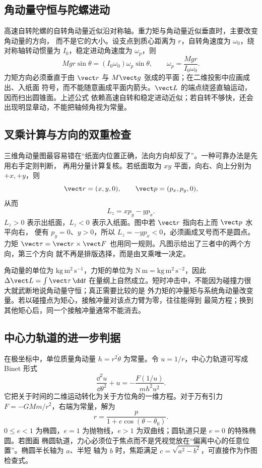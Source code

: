 \subsection*{角动量守恒与陀螺进动}

高速自转陀螺的自转角动量近似沿对称轴。重力矩与角动量近似垂直时，主要改变角动量的方向，
而不是它的大小。设支点到质心距离为 $r$，自转角速度为 $\omega_0$，绕对称轴转动惯量为
$I_0$，稳定进动角速度为 $\omega_p$，则
\[
  Mgr\sin\theta=(I_0\omega_0)\omega_p\sin\theta,
  \qquad
  \omega_p=\frac{Mgr}{I_0\omega_0}.
\]
力矩方向必须垂直于由 $\vect r$ 与 $M\vect g$ 张成的平面；在二维投影中应画成出、入纸面
符号，而不能随意画成平面内箭头。$\vect L$ 的端点绕竖直轴运动，因而扫出圆锥面。上述公式
依赖高速自转和稳定进动近似；若自转不够快，还会出现明显章动，不能把轴倾角视为常量。

\subsection*{叉乘计算与方向的双重检查}

三维角动量图最容易错在“纸面内位置正确，法向方向却反了”。一种可靠办法是先用右手定则判断，
再用分量计算复核。若纸面取为 $xy$ 平面，向右、向上分别为 $+x,+y$，则
\[
 \vect r=(x,y,0),\qquad \vect p=(p_x,p_y,0),
\]
从而
\[
 L_z=xp_y-yp_x.
\]
$L_z>0$ 表示出纸面，$L_z<0$ 表示入纸面。图中若 $\vect r$ 指向右上而 $\vect p$ 水平向右，
便有 $p_y=0$、$y>0$，所以 $L_z=-yp_x<0$，必须画成叉号而不是圆点。力矩
$\vect\tau=\vect r\times\vect F$ 也用同一规则。凡图示给出了三者中的两个方向，第三个方向
就不再是排版选择，而是由叉乘唯一决定。

角动量的单位为 $\mathrm{kg\,m^2\,s^{-1}}$，力矩的单位为
$\mathrm{N\,m}=\mathrm{kg\,m^2\,s^{-2}}$，因此 $\Delta\vect L=\int\vect\tau\,\dd t$
在量纲上自然成立。短时冲击中，不能因为碰撞力很大就武断地说角动量守恒；真正需要比较的是
外力矩的冲量矩与系统角动量改变量。若以碰撞点为矩心，接触冲量对该点力臂为零，往往能得到
最简方程；换到其他矩心后，同一个接触冲量通常不能消去。

\subsection*{中心力轨道的进一步判据}

在极坐标中，单位质量角动量 $h=r^2\dot\theta$ 为常量。令 $u=1/r$，中心力轨道可写成 Binet
形式
\[
 \frac{\dd^2u}{\dd\theta^2}+u=-\frac{F(1/u)}{mh^2u^2}.
\]
它把关于时间的二维运动转化为关于方位角的一维方程。对于万有引力
$F=-GMm/r^2$，右端为常量，解为
\[
 r=\frac{p}{1+e\cos(\theta-\theta_0)}.
\]
$0\le e<1$ 为椭圆，$e=1$ 为抛物线，$e>1$ 为双曲线；圆轨道只是 $e=0$ 的特殊椭圆。若图画
椭圆轨道，力心必须位于焦点而不是凭视觉放在“偏离中心的任意位置”。椭圆半长轴为 $a$、半短
轴为 $b$ 时，焦距满足 $c=\sqrt{a^2-b^2}$，可直接作为作图检查式。

